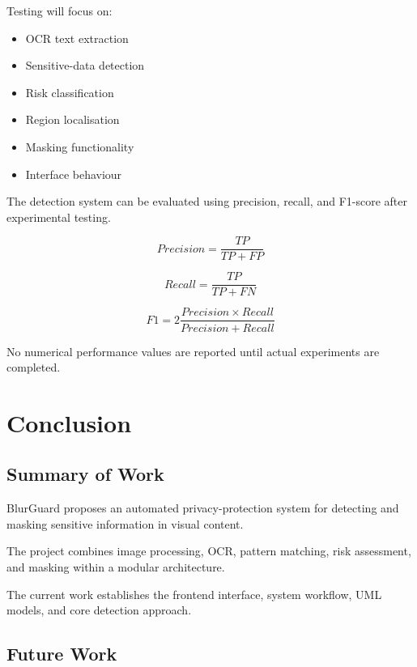 \documentclass[12pt,a4paper]{tietreport}
\begin{document}
Testing will focus on:

\begin{itemize}
    \item OCR text extraction
    \item Sensitive-data detection
    \item Risk classification
    \item Region localisation
    \item Masking functionality
    \item Interface behaviour
\end{itemize}

The detection system can be evaluated using precision, recall, and F1-score after experimental testing.

\begin{equation}
Precision = \frac{TP}{TP+FP}
\end{equation}

\begin{equation}
Recall = \frac{TP}{TP+FN}
\end{equation}

\begin{equation}
F1 =
2\frac{Precision \times Recall}
{Precision + Recall}
\end{equation}

No numerical performance values are reported until actual experiments are completed.


\chapter{Conclusion}

\section{Summary of Work}

BlurGuard proposes an automated privacy-protection system for detecting and masking sensitive information in visual content.

The project combines image processing, OCR, pattern matching, risk assessment, and masking within a modular architecture.

The current work establishes the frontend interface, system workflow, UML models, and core detection approach.

\section{Future Work}
\end{document}
